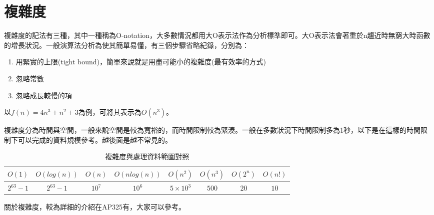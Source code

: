\section{複雜度}
    複雜度的記法有三種，其中一種稱為O-notation，大多數情況都用大O表示法作為分析標準即可。大O表示法會著重於n趨近時無窮大時函數的增長狀況。一般演算法分析為使其簡單易懂，有三個步驟省略紀錄，分別為：

    \begin{enumerate}
        \item 用緊實的上限(tight bound)，簡單來說就是用盡可能小的複雜度(最有效率的方式)
        \item 忽略常數
        \item 忽略成長較慢的項
    \end{enumerate}

    以$f(n)=4n^3+n^2+3$為例，可將其表示為$O(n^3)$。

    複雜度分為時間與空間，一般來說空間是較為寬裕的，而時間限制較為緊湊。一般在多數狀況下時間限制多為1秒，以下是在這樣的時間限制下可以完成的資料規模參考。越後面是越不常見的。

    \begin{table}[h!]
        \centering
        \begin{tabular}{c|c|c|c|c|c|c|c}
            $O(1)$ & $O(log⁡(n))$ & $O(n)$ & $O(nlog⁡(n))$ & $O(n^2)$ & $O(n^3)$ & $O(2^n)$ & $O(n!)$\\
            \hline
            $2^{63}-1$ & $2^{63}-1$ & $10^7$ & $10^6$ & $5 \times 10^3$ & $500$ & $20$ & $10$
        \end{tabular}
        \caption{複雜度與處理資料範圍對照}
        \label{tab:my_label}
    \end{table}

    關於複雜度，較為詳細的介紹在AP325有，大家可以參考。